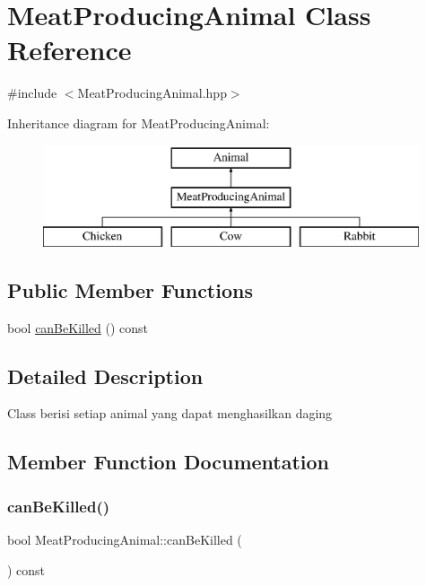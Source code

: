 \hypertarget{class_meat_producing_animal}{}\section{Meat\+Producing\+Animal Class Reference}
\label{class_meat_producing_animal}


{\ttfamily \#include $<$Meat\+Producing\+Animal.\+hpp$>$}

Inheritance diagram for Meat\+Producing\+Animal\+:\begin{figure}[H]
\begin{center}
\leavevmode
\includegraphics[height=3.000000cm]{class_meat_producing_animal}
\end{center}
\end{figure}
\subsection*{Public Member Functions}
\begin{DoxyCompactItemize}
\item 
bool \mbox{\hyperlink{class_meat_producing_animal_a796b39685df5e9d2a727d494254bfbee}{can\+Be\+Killed}} () const
\end{DoxyCompactItemize}


\subsection{Detailed Description}
Class berisi setiap animal yang dapat menghasilkan daging 

\subsection{Member Function Documentation}
\mbox{\label{class_meat_producing_animal_a796b39685df5e9d2a727d494254bfbee}} 
\subsubsection{\texorpdfstring{canBeKilled()}{canBeKilled()}}
{\footnotesize\ttfamily bool Meat\+Producing\+Animal\+::can\+Be\+Killed (\begin{DoxyParamCaption}{ }\end{DoxyParamCaption}) const\hspace{0.3cm}{\ttfamily [virtual]}}

